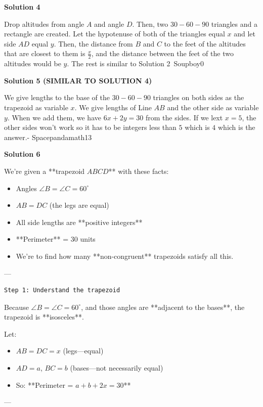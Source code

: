 \begin{enumerate}
\textbf{Solution 4}

Drop altitudes from angle $A$ and angle $D$. Then, two $30-60-90$ triangles and a rectangle are created. Let the hypotenuse of both of the triangles equal $x$ and let side $AD$ equal $y$. Then, the distance from $B$ and $C$ to the feet of the altitudes that are closest to them is $\frac{x}{2}$, and the distance between the feet of the two altitudes would be $y$. The rest is similar to Solution 2~Soupboy0

 



\textbf{Solution 5 (SIMILAR TO SOLUTION 4)}

We give lengths to the base of the $30-60-90$ triangles on both sides as the trapezoid as variable $x$.  We give lengths of Line $AB$ and the other side as variable $y$.  When we add them, we have $6x+2y=30$ from the sides.  If we lext $x=5$, the other sides won't work so it has to be integers less than $5$ which is $4$ which is the answer.- Spacepandamath13

 



\textbf{Solution 6}

We’re given a **trapezoid $ABCD$** with these facts:

 
            \begin{itemize}
        \item Angles $\angle B = \angle C = 60^\circ$
        \item $AB = DC$ (the legs are equal)
        \item All side lengths are **positive integers**
        \item **Perimeter** = 30 units
        \item We’re to find how many **non-congruent** trapezoids satisfy all this.
            \end{itemize}
            ---

 \begin{verbatim}
Step 1: Understand the trapezoid
\end{verbatim}

Because $\angle B = \angle C = 60^\circ$, and those angles are **adjacent to the bases**, the trapezoid is **isosceles**.

 Let:

 
            \begin{itemize}
        \item $AB = DC = x$ (legs—equal)
        \item $AD = a$, $BC = b$ (bases—not necessarily equal)
        \item So: **Perimeter = $a + b + 2x = 30$**
            \end{itemize}
            ---


\end{enumerate}
